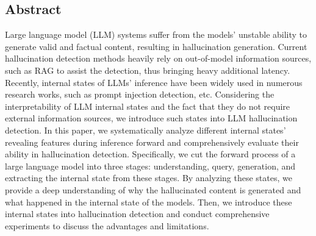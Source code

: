 \subsection*{Abstract}
Large language model (LLM) systems suffer from the models' unstable ability to generate valid and factual content, resulting in hallucination generation.
Current hallucination detection methods heavily rely on out-of-model information sources, such as RAG to assist the detection, thus bringing heavy additional latency.
Recently, internal states of LLMs' inference have been widely used in numerous research works, such as prompt injection detection, etc.
Considering the interpretability of LLM internal states and the fact that they do not require external information sources, we introduce such states into LLM hallucination detection.
In this paper, we systematically analyze different internal states' revealing features during inference forward and comprehensively evaluate their ability in hallucination detection.
Specifically, we cut the forward process of a large language model into three stages: understanding, query, generation, and extracting the internal state from these stages.
By analyzing these states, we provide a deep understanding of why the hallucinated content is generated and what happened in the internal state of the models.
Then, we introduce these internal states into hallucination detection and conduct comprehensive experiments to discuss the advantages and limitations.
